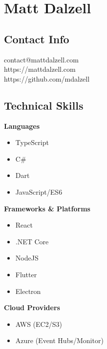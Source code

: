 \documentclass[12pt]{article}
\begin{document}

\section*{Matt Dalzell}

\setlength{\columnsep}{4em}
\setlength{\columnseprule}{0.1pt}
\begin{paracol}{2}

\subsection*{Contact Info}
contact@mattdalzell.com \\ 
https://mattdalzell.com \\
https://github.com/mdalzell 

\subsection*{Technical Skills} 

\textbf{Languages}
\begin{itemize}
    \setlength\itemsep{0em}
    \item {\footnotesize{TypeScript}}
    \item {\footnotesize{C\#}}
    \item {\footnotesize{Dart}}
    \item {\footnotesize{JavaScript/ES6}}
\end{itemize}

\noindent \textbf{Frameworks \& Platforms}
\begin{itemize}
    \setlength\itemsep{0em}
    \item {\footnotesize{React}}
    \item {\footnotesize{.NET Core}}
    \item {\footnotesize{NodeJS}}
    \item {\footnotesize{Flutter}}
    \item {\footnotesize{Electron}}
\end{itemize}

\noindent \textbf{Cloud Providers}
\begin{itemize}
    \setlength\itemsep{0em}
    \item {\footnotesize{AWS (EC2/S3)}}
    \item {\footnotesize{Azure (Event Hubs/Monitor)}}
\end{itemize}


\end{paracol}
\end{document}

